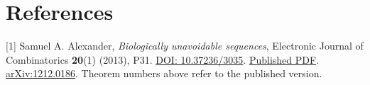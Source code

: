 \documentclass[
  11pt,
]{article}
\begin{document}
\section{References}\label{references}

{[}1{]} Samuel A. Alexander, \emph{Biologically unavoidable sequences},
Electronic Journal of Combinatorics \textbf{20}(1) (2013), P31.
\href{https://doi.org/10.37236/3035}{DOI: 10.37236/3035}.
\href{https://www.combinatorics.org/ojs/index.php/eljc/article/download/v20i1p31/pdf/}{Published
PDF}. \href{https://arxiv.org/abs/1212.0186}{arXiv:1212.0186}. Theorem
numbers above refer to the published version.
\end{document}
